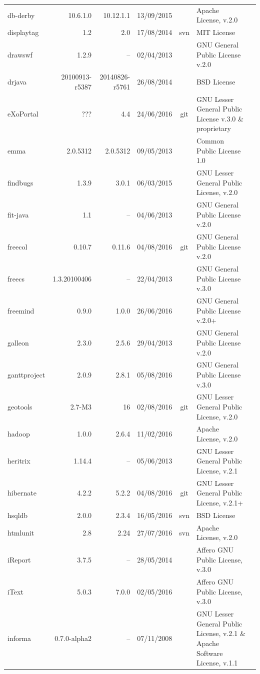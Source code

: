 \documentclass{IEEEtran}
\begin{document}
\begin{table}[h]
{\begin{tabular}{l|r|r|c|c|p{5cm}|p{3cm}}
	db-derby & 10.6.1.0 & 10.12.1.1 & 13/09/2015 & & Apache License, v.2.0 \\
	displaytag & 1.2 & 2.0 & 17/08/2014 & svn & MIT License \\
	drawswf & 1.2.9 & -- & 02/04/2013 & & GNU General Public License v.2.0 \\
	drjava & 20100913-r5387 & 20140826-r5761 & 26/08/2014 & & BSD License \\
	eXoPortal & ??? & 4.4 & 24/06/2016 & git & GNU Lesser General Public License v.3.0 \& proprietary \\
	emma & 2.0.5312 & 2.0.5312 & 09/05/2013  & & Common Public License 1.0 \\
	findbugs & 1.3.9 & 3.0.1 & 06/03/2015 & & GNU Lesser General Public License, v.2.0 \\
	fit-java & 1.1 & -- & 04/06/2013 & & GNU General Public License v.2.0 \\
	freecol & 0.10.7 & 0.11.6 & 04/08/2016 & git & GNU General Public License v.2.0 &  \\
	freecs & 1.3.20100406 & -- & 22/04/2013 & & GNU General Public License v.3.0 &   \\
	freemind & 0.9.0 & 1.0.0 & 26/06/2016 & & GNU General Public License v.2.0+ &  \\
	galleon & 2.3.0 & 2.5.6 & 29/04/2013 & & GNU General Public License v.2.0 \\
	ganttproject & 2.0.9 & 2.8.1 & 05/08/2016 & & GNU General Public License v.3.0 &  \\
	geotools & 2.7-M3 & 16 & 02/08/2016 & git & GNU Lesser General Public License, v.2.0 \\
	hadoop & 1.0.0 & 2.6.4 & 11/02/2016 & & Apache License, v.2.0 \\
	heritrix & 1.14.4 & -- & 05/06/2013 & & GNU Lesser General Public License, v.2.1 \\
	hibernate & 4.2.2 & 5.2.2 & 04/08/2016 & git & GNU Lesser General Public License, v.2.1+ \\
	hsqldb & 2.0.0 & 2.3.4 & 16/05/2016 & svn & BSD License \\
	htmlunit & 2.8 & 2.24 & 27/07/2016 & svn & Apache License, v.2.0 \\
	iReport & 3.7.5 & -- & 28/05/2014 & & Affero GNU Public License, v.3.0 \\
	iText & 5.0.3 & 7.0.0 & 02/05/2016 & & Affero GNU Public License, v.3.0 \\
	informa & 0.7.0-alpha2 & -- & 07/11/2008 & & GNU Lesser General Public License, v.2.1 \& Apache Software License, v.1.1 \\

\end{tabular}}
\end{table}
\end{document}
